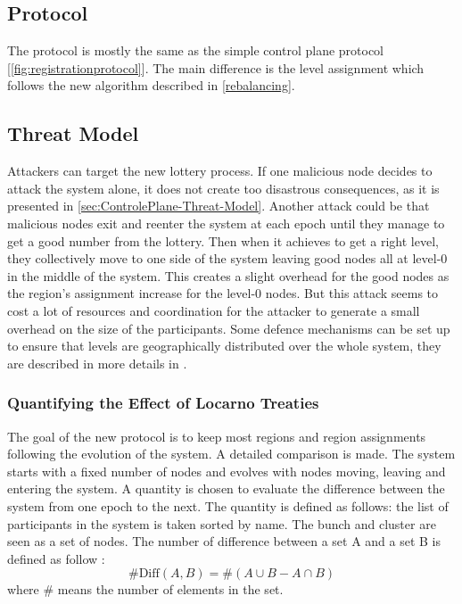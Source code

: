 \documentclass[a4paper,11pt,twoside=semi,openright]{report}
\begin{document}
\subsection{Protocol}
The protocol is mostly the same as the simple control plane protocol
[\autoref{fig:registrationprotocol}]. The main difference is the level
assignment which follows the new algorithm described in \autoref{rebalancing}. 

\subsection{Threat Model}

Attackers can target the new lottery process. If one malicious node decides to
attack the system alone, it does not create too disastrous consequences, as it
is presented in \autoref{sec:ControlePlane-Threat-Model}. Another attack could
be that malicious nodes exit and reenter the system at each epoch until they
manage to get a good number from the lottery. Then when it achieves to get a
right level, they collectively move to one side of the system leaving good
nodes all at level-0 in the middle of the system. This creates a slight
overhead for the good nodes as the region’s assignment increase for the level-0
nodes.  But this attack seems to cost a lot of resources and coordination for
the attacker to generate a small overhead on the size of the participants. Some
defence mechanisms can be set up to ensure that levels are geographically
distributed over the whole system, they are described in more details in
.

\subsubsection{Quantifying the Effect of Locarno Treaties}
The goal of the new protocol is to keep most regions and region assignments
following the evolution of the system. A detailed comparison is made. The
system starts with a fixed number of nodes and evolves with nodes moving,
leaving and entering the system. A quantity is chosen to evaluate the
difference between the system from one epoch to the next. The quantity is
defined as follows: the list of participants in the system is taken sorted by
name. The bunch and cluster are seen as a set of nodes. The number of
difference between a set A and a set B is defined as follow :
\begin{equation}
\# \textrm{Diff}(A,B) = \#(A \cup B - A \cap B )
\end{equation}
where $\#$ means the number of elements in the set.
\end{document}
